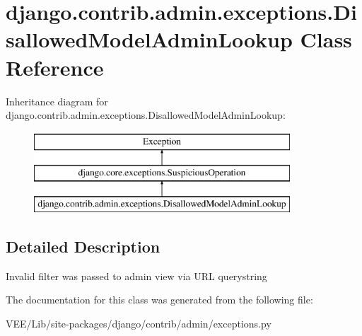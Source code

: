 \hypertarget{classdjango_1_1contrib_1_1admin_1_1exceptions_1_1_disallowed_model_admin_lookup}{}\section{django.\+contrib.\+admin.\+exceptions.\+Disallowed\+Model\+Admin\+Lookup Class Reference}
\label{classdjango_1_1contrib_1_1admin_1_1exceptions_1_1_disallowed_model_admin_lookup}
Inheritance diagram for django.\+contrib.\+admin.\+exceptions.\+Disallowed\+Model\+Admin\+Lookup\+:\begin{figure}[H]
\begin{center}
\leavevmode
\includegraphics[height=3.000000cm]{classdjango_1_1contrib_1_1admin_1_1exceptions_1_1_disallowed_model_admin_lookup}
\end{center}
\end{figure}


\subsection{Detailed Description}
\begin{DoxyVerb}Invalid filter was passed to admin view via URL querystring\end{DoxyVerb}
 

The documentation for this class was generated from the following file\+:\begin{DoxyCompactItemize}
\item 
V\+E\+E/\+Lib/site-\/packages/django/contrib/admin/exceptions.\+py\end{DoxyCompactItemize}
